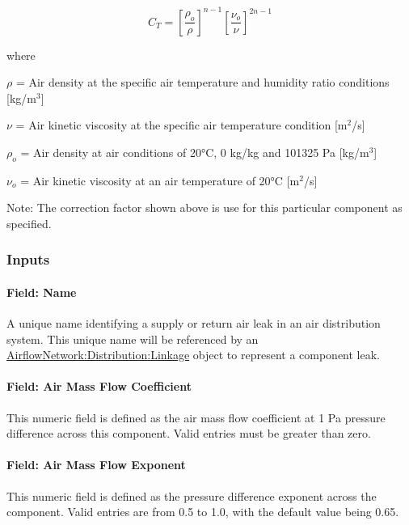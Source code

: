 \begin{equation}
{C_T} = {\left[ {\frac{{{\rho_o}}}{\rho }} \right]^{n - 1}}{\left[ {\frac{{{\nu_o}}}{\nu }} \right]^{2n - 1}}
\end{equation}

where

\(\rho\) = Air density at the specific air temperature and humidity ratio conditions {[}kg/m\(^{3}\){]}

\(\nu\) = Air kinetic viscosity at the specific air temperature condition {[}m\(^{2}\)/s{]}

\(\rho_o\) = Air density at air conditions of 20°C, 0 kg/kg and 101325 Pa {[}kg/m\(^{3}\){]}

\(\nu_o\) = Air kinetic viscosity at an air temperature of 20°C {[}m\(^{2}\)/s{]}

Note: The correction factor shown above is use for this particular component as specified.

\subsubsection{Inputs}\label{inputs-13-001}

\paragraph{Field: Name}\label{field-name-15-000}

A unique name identifying a supply or return air leak in an air distribution system. This unique name will be referenced by an \hyperref[airflownetworkdistributionlinkage]{AirflowNetwork:Distribution:Linkage} object to represent a component leak.

\paragraph{Field: Air Mass Flow Coefficient}\label{field-air-mass-flow-coefficient}

This numeric field is defined as the air mass flow coefficient at 1 Pa pressure difference across this component. Valid entries must be greater than zero.

\paragraph{Field: Air Mass Flow Exponent}\label{field-air-mass-flow-exponent-2}

This numeric field is defined as the pressure difference exponent across the component. Valid entries are from 0.5 to 1.0, with the default value being 0.65.

